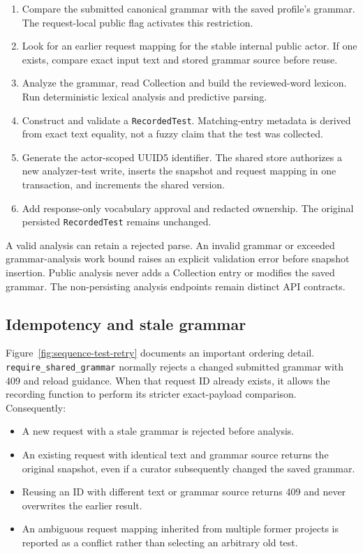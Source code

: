 \documentclass[11pt,a4paper]{article}
\begin{document}
\begin{enumerate}
\item Compare the submitted canonical grammar with the saved profile's grammar.
The request-local public flag activates this restriction.
\item Look for an earlier request mapping for the stable internal public actor.
If one exists, compare exact input text and stored grammar source before reuse.
\item Analyze the grammar, read Collection and build the reviewed-word lexicon.
Run deterministic lexical analysis and predictive parsing.
\item Construct and validate a \texttt{RecordedTest}. Matching-entry metadata is
derived from exact text equality, not a fuzzy claim that the test was collected.
\item Generate the actor-scoped UUID5 identifier. The shared store authorizes a
new analyzer-test write, inserts the snapshot and request mapping in one
transaction, and increments the shared version.
\item Add response-only vocabulary approval and redacted ownership.
The original persisted \texttt{RecordedTest} remains unchanged.
\end{enumerate}

A valid analysis can retain a rejected parse. An invalid grammar or exceeded
grammar-analysis work bound raises an explicit validation error before snapshot
insertion. Public analysis never adds a Collection entry or modifies the saved
grammar. The non-persisting analysis endpoints remain distinct API contracts.

\subsection{Idempotency and stale grammar}
Figure~\ref{fig:sequence-test-retry} documents an important ordering detail.
\texttt{require\_shared\_grammar} normally rejects a changed submitted grammar
with 409 and reload guidance. When that request ID already exists, it allows
the recording function to perform its stricter exact-payload comparison.
Consequently:
\begin{itemize}
\item A new request with a stale grammar is rejected before analysis.
\item An existing request with identical text and grammar source returns the
original snapshot, even if a curator subsequently changed the saved grammar.
\item Reusing an ID with different text or grammar source returns 409 and never
overwrites the earlier result.
\item An ambiguous request mapping inherited from multiple former projects is
reported as a conflict rather than selecting an arbitrary old test.
\end{itemize}
\end{document}
